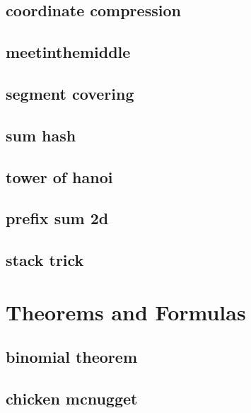 \subsection{coordinate compression}
\raggedbottom
\hrulefill
\subsection{meetinthemiddle}
\raggedbottom
\hrulefill
\subsection{segment covering}
\raggedbottom
\hrulefill
\subsection{sum hash}
\raggedbottom
\hrulefill
\subsection{tower of hanoi}
\raggedbottom
\hrulefill
\subsection{prefix sum 2d}
\raggedbottom
\hrulefill
\subsection{stack trick}
\raggedbottom
\hrulefill

\section{Theorems and Formulas}
\subsection{binomial theorem}
\raggedbottom
\hrulefill
\subsection{chicken mcnugget}
\raggedbottom
\hrulefill
